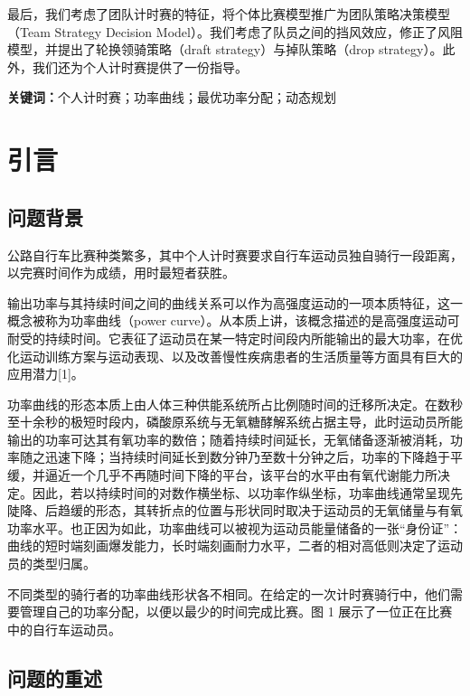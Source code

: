 \documentclass[11pt,a4paper]{ctexart}
\begin{document}
最后，我们考虑了团队计时赛的特征，将个体比赛模型推广为团队策略决策模型（Team Strategy Decision Model）。我们考虑了队员之间的挡风效应，修正了风阻模型，并提出了轮换领骑策略（draft strategy）与掉队策略（drop strategy）。此外，我们还为个人计时赛提供了一份指导。

\vspace{6pt}
\noindent\textbf{关键词：}个人计时赛；功率曲线；最优功率分配；动态规划

\newpage
\pagestyle{fancy}

\section{引言}

\subsection{问题背景}

公路自行车比赛种类繁多，其中个人计时赛要求自行车运动员独自骑行一段距离，以完赛时间作为成绩，用时最短者获胜。

输出功率与其持续时间之间的曲线关系可以作为高强度运动的一项本质特征，这一概念被称为功率曲线（power curve）。从本质上讲，该概念描述的是高强度运动可耐受的持续时间。它表征了运动员在某一特定时间段内所能输出的最大功率，在优化运动训练方案与运动表现、以及改善慢性疾病患者的生活质量等方面具有巨大的应用潜力[1]。

功率曲线的形态本质上由人体三种供能系统所占比例随时间的迁移所决定。在数秒至十余秒的极短时段内，磷酸原系统与无氧糖酵解系统占据主导，此时运动员所能输出的功率可达其有氧功率的数倍；随着持续时间延长，无氧储备逐渐被消耗，功率随之迅速下降；当持续时间延长到数分钟乃至数十分钟之后，功率的下降趋于平缓，并逼近一个几乎不再随时间下降的平台，该平台的水平由有氧代谢能力所决定。因此，若以持续时间的对数作横坐标、以功率作纵坐标，功率曲线通常呈现先陡降、后趋缓的形态，其转折点的位置与形状同时取决于运动员的无氧储量与有氧功率水平。也正因为如此，功率曲线可以被视为运动员能量储备的一张“身份证”：曲线的短时端刻画爆发能力，长时端刻画耐力水平，二者的相对高低则决定了运动员的类型归属。

不同类型的骑行者的功率曲线形状各不相同。在给定的一次计时赛骑行中，他们需要管理自己的功率分配，以便以最少的时间完成比赛。图 1 展示了一位正在比赛中的自行车运动员。

\subsection{问题的重述}
\end{document}
